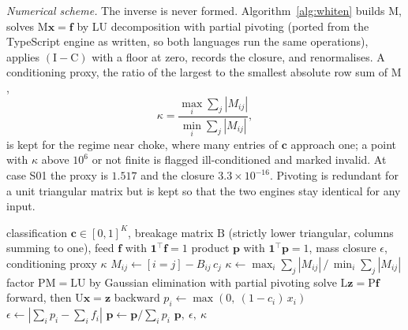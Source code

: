 \emph{Numerical scheme.} The inverse is never formed. Algorithm~\ref{alg:whiten} builds $\mathrm M$, solves $\mathrm M\mathbf x=\mathbf f$
by LU decomposition with partial pivoting (ported from the TypeScript engine as written, so both languages run the same operations),
applies $(\mathrm I-\mathrm C)$ with a floor at zero, records the closure, and renormalises. A conditioning proxy, the ratio of the
largest to the smallest absolute row sum of $\mathrm M$,
\begin{equation}
\kappa = \frac{\max_i \sum_j |M_{ij}|}{\min_i \sum_j |M_{ij}|},
\label{eq:cond}
\end{equation}
is kept for the regime near choke, where many entries of $\mathbf c$ approach one; a point with $\kappa$ above $10^{6}$ or not finite is
flagged ill-conditioned and marked invalid. At case S01 the proxy is $1.517$ and the closure $3.3\times10^{-16}$. Pivoting is
redundant for a unit triangular matrix but is kept so that the two engines stay identical for any input.

\begin{algorithm}[!t]
\caption{The Whiten solve of one operating point, as \texttt{whiten\_solve} runs it.}
\label{alg:whiten}
\begin{algorithmic}[1]
\Require classification $\mathbf c\in[0,1]^K$, breakage matrix $\mathrm B$ (strictly lower triangular, columns summing to one), feed $\mathbf f$ with $\mathbf 1^{\top}\mathbf f=1$
\Ensure product $\mathbf p$ with $\mathbf 1^{\top}\mathbf p=1$, mass closure $\epsilon$, conditioning proxy $\kappa$
  \State $M_{ij}\gets [i=j] - B_{ij}\,c_j$ 
\EndFor
\State $\kappa \gets \max_i\sum_j|M_{ij}| \,/\, \min_i\sum_j|M_{ij}|$
\State factor $\mathrm P\mathrm M=\mathrm L\mathrm U$ by Gaussian elimination with partial pivoting 
\State solve $\mathrm L\mathbf z=\mathrm P\mathbf f$ forward, then $\mathrm U\mathbf x=\mathbf z$ backward
  \State $p_i\gets\max\!\left(0,\ (1-c_i)\,x_i\right)$
\EndFor
\State $\epsilon\gets\left|\sum_i p_i - \sum_i f_i\right|$ 
\State $\mathbf p\gets\mathbf p/\sum_i p_i$
\State \Return $\mathbf p,\ \epsilon,\ \kappa$
\end{algorithmic}
\end{algorithm}

